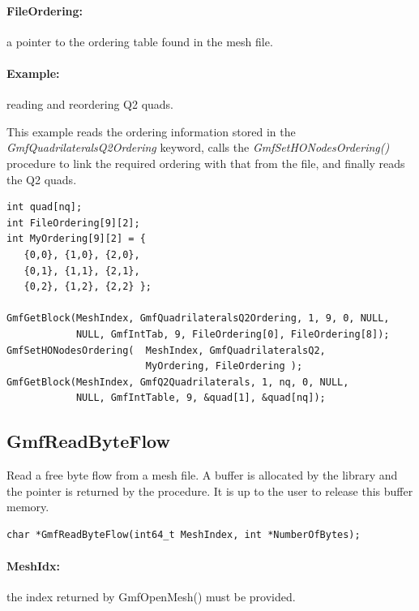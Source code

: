 \documentclass[a4paper,12pt]{article}
\begin{document}
\paragraph{FileOrdering:} a pointer to the ordering table found in the mesh file.

\paragraph{Example:} reading and reordering Q2 quads.

This example reads the ordering information stored in the \emph{GmfQuadrilateralsQ2Ordering} keyword, calls the \emph{GmfSetHONodesOrdering()} procedure to link the required ordering with that from the file, and finally reads the Q2 quads.

\begin{tt}
\begin{verbatim}
int quad[nq];
int FileOrdering[9][2];
int MyOrdering[9][2] = {
   {0,0}, {1,0}, {2,0},
   {0,1}, {1,1}, {2,1},
   {0,2}, {1,2}, {2,2} };

GmfGetBlock(MeshIndex, GmfQuadrilateralsQ2Ordering, 1, 9, 0, NULL,
            NULL, GmfIntTab, 9, FileOrdering[0], FileOrdering[8]);
GmfSetHONodesOrdering(  MeshIndex, GmfQuadrilateralsQ2,
                        MyOrdering, FileOrdering );
GmfGetBlock(MeshIndex, GmfQ2Quadrilaterals, 1, nq, 0, NULL,
            NULL, GmfIntTable, 9, &quad[1], &quad[nq]);
\end{verbatim}
\end{tt}
\normalfont


\subsection{GmfReadByteFlow}
Read a free byte flow from a mesh file.
A buffer is allocated by the library and the pointer is returned by the procedure.
It is up to the user to release this buffer memory.

\begin{tt}
\begin{verbatim}
char *GmfReadByteFlow(int64_t MeshIndex, int *NumberOfBytes);
\end{verbatim}
\end{tt}
\normalfont

\paragraph{MeshIdx:}
the index returned by GmfOpenMesh() must be provided.
\end{document}
